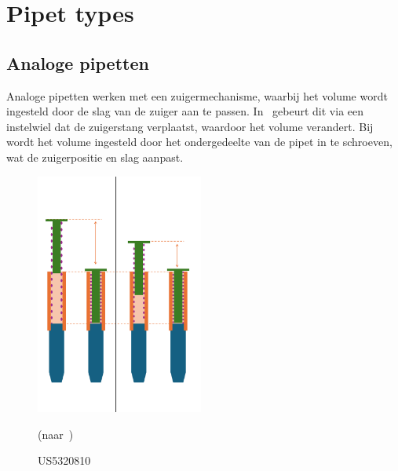 \section{Pipet types} \subsection{Analoge pipetten}\label{sec: Analoge pipetten} 
Analoge pipetten werken met een zuigermechanisme, waarbij het volume wordt ingesteld door de slag van de zuiger aan te passen. In\ \cite{RN17} gebeurt dit via een instelwiel dat de zuigerstang verplaatst, waardoor het volume verandert. Bij\ \cite{RN16} wordt het volume ingesteld door het ondergedeelte van de pipet in te schroeven, wat de zuigerpositie en slag aanpast.

\begin{minipage}[t]{0.49\textwidth} 
    \vspace{0pt} 
    \begin{figure}[H] 
        \centering 
        \includegraphics[width=0.49\textwidth]{figures/Werking US5320810.png} 
        \caption{US5320810}\label{fig:werking US5320810} 
        (naar\ \cite{RN17})
    \end{figure} 
\end{minipage}
